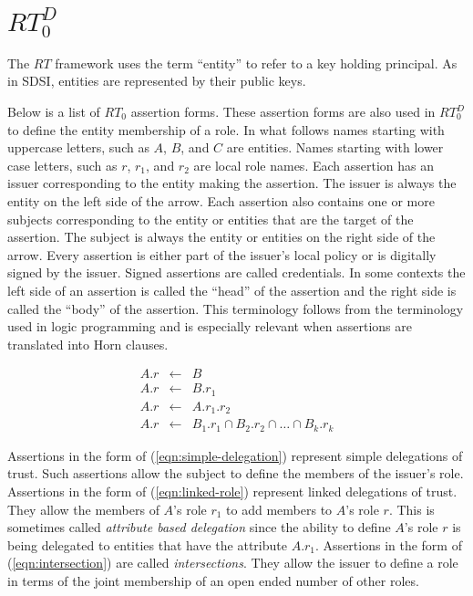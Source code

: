 \documentclass{article}
\newcommand{\newterm}[1]{\textit{#1}}
\begin{document}
\section{$RT_0^D$}
\label{sec:RT0D}

The $RT$ framework uses the term ``entity'' to refer to a key holding principal. As in SDSI,
entities are represented by their public keys.


Below is a list of $RT_0$ assertion forms. These assertion forms are also used in $RT_0^D$ to
define the entity membership of a role. In what follows names starting with uppercase letters,
such as $A$, $B$, and $C$ are entities. Names starting with lower case letters, such as $r$,
$r_1$, and $r_2$ are local role names. Each assertion has an issuer corresponding to the entity
making the assertion. The issuer is always the entity on the left side of the arrow. Each
assertion also contains one or more subjects corresponding to the entity or entities that are
the target of the assertion. The subject is always the entity or entities on the right side of
the arrow. Every assertion is either part of the issuer's local policy or is digitally signed by
the issuer. Signed assertions are called credentials. In some contexts the left side of an
assertion is called the ``head'' of the assertion and the right side is called the ``body'' of
the assertion. This terminology follows from the terminology used in logic programming and is
especially relevant when assertions are translated into Horn clauses.

\begin{eqnarray}
  A.r & \leftarrow & B \label{eqn:simple-membership} \\
  A.r & \leftarrow & B.r_1 \label{eqn:simple-delegation} \\
  A.r & \leftarrow & A.r_1.r_2 \label{eqn:linked-role} \\
  A.r & \leftarrow & B_1.r_1 \cap B_2.r_2 \cap \ldots \cap B_k.r_k \label{eqn:intersection}
\end{eqnarray}

Assertions in the form of (\ref{eqn:simple-delegation}) represent simple delegations of trust.
Such assertions allow the subject to define the members of the issuer's role. Assertions in the
form of (\ref{eqn:linked-role}) represent linked delegations of trust. They allow the members of
$A$'s role $r_1$ to add members to $A$'s role $r$. This is sometimes called \newterm{attribute
  based delegation} since the ability to define $A$'s role $r$ is being delegated to entities
that have the attribute $A.r_1$. Assertions in the form of (\ref{eqn:intersection}) are called
\newterm{intersections}. They allow the issuer to define a role in terms of the joint membership
of an open ended number of other roles.
\end{document}
